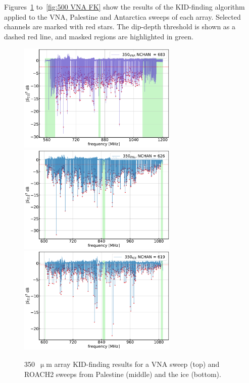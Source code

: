 Figures~\ref{fig:350 VNA FK} to~\ref{fig:500 VNA FK} show the results of the KID-finding algorithm applied to the VNA, Palestine and Antarctica sweeps of each array. Selected channels are marked with red stars. The dip-depth threshold is shown as a dashed red line, and masked regions are highlighted in green.

\begin{figure}[!p]
\centering
\caption[~ array KID-finding results.]{350~$\upmu$m array KID-finding results for a VNA sweep (top) and ROACH2 sweeps from Palestine (middle) and the ice (bottom).}
\includegraphics[width=0.68\textwidth]{figures/blast_data/sweeps/350_May2018VNA_FK}
\includegraphics[width=0.68\textwidth]{figures/blast_data/sweeps/350_PAL_FK}
\includegraphics[width=0.68\textwidth]{figures/blast_data/sweeps/350_ICE_FK}
\label{fig:350 VNA FK}
\end{figure}

